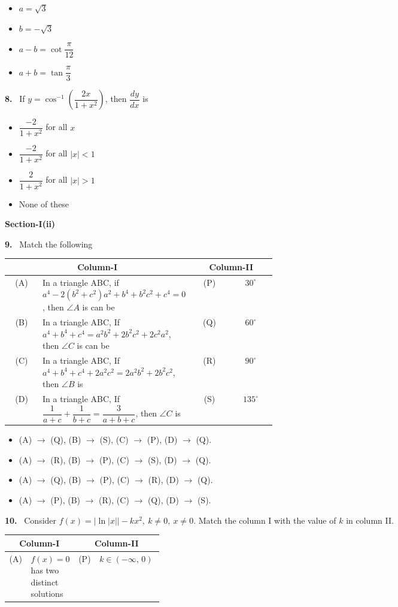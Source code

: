 \documentclass[10pt]{extarticle}
\newcommand{\sect}[1]{\par\smallskip\noindent\textbf{#1}\par}
\newcommand{\qn}[1]{\par\smallskip\noindent\textbf{#1.}~}
\newenvironment{qoptions}{\begin{itemize}[leftmargin=1.8em,itemsep=1pt,topsep=2pt,label={}]}{\end{itemize}}
\newcommand{\opt}[2]{\item[(#1)] #2}
\begin{document}
\begin{multicols}{2}
\begin{qoptions}
\opt{A}{$a=\sqrt3$}
\opt{B}{$b=-\sqrt3$}
\opt{C}{$a-b=\cot\dfrac\pi{12}$}
\opt{D}{$a+b=\tan\dfrac\pi3$}
\end{qoptions}
\qn{8} If $y=\cos^{-1}\left(\dfrac{2x}{1+x^2}\right)$, then $\dfrac{dy}{dx}$ is
\begin{qoptions}
\opt{A}{$\dfrac{-2}{1+x^2}$ for all $x$}
\opt{B}{$\dfrac{-2}{1+x^2}$ for all $|x|<1$}
\opt{C}{$\dfrac{2}{1+x^2}$ for all $|x|>1$}
\opt{D}{None of these}
\end{qoptions}
\sect{Section-I(ii)}
\qn{9} Match the following
\begin{center}\small\renewcommand{\arraystretch}{1.3}
\begin{tabular}{|c|p{0.52\linewidth}|c|c|}\hline
\multicolumn{2}{|c|}{\textbf{Column-I}} & \multicolumn{2}{c|}{\textbf{Column-II}}\\\hline
(A) & In a triangle ABC, if $a^4-2\left(b^2+c^2\right)a^2+b^4+b^2c^2+c^4=0$, then $\angle A$ is can be & (P) & $30^\circ$\\\hline
(B) & In a triangle ABC, If $a^4+b^4+c^4=a^2b^2+2b^2c^2+2c^2a^2$, then $\angle C$ is can be & (Q) & $60^\circ$\\\hline
(C) & In a triangle ABC, If $a^4+b^4+c^4+2a^2c^2=2a^2b^2+2b^2c^2$, then $\angle B$ is & (R) & $90^\circ$\\\hline
(D) & In a triangle ABC, If $\dfrac1{a+c}+\dfrac1{b+c}=\dfrac3{a+b+c}$, then $\angle C$ is & (S) & $135^\circ$\\\hline
\end{tabular}
\end{center}
\begin{qoptions}
\opt{A}{(A) $\to$ (Q), (B) $\to$ (S), (C) $\to$ (P), (D) $\to$ (Q).}
\opt{B}{(A) $\to$ (R), (B) $\to$ (P), (C) $\to$ (S), (D) $\to$ (Q).}
\opt{C}{(A) $\to$ (Q), (B) $\to$ (P), (C) $\to$ (R), (D) $\to$ (Q).}
\opt{D}{(A) $\to$ (P), (B) $\to$ (R), (C) $\to$ (Q), (D) $\to$ (S).}
\end{qoptions}
\qn{10} Consider $f(x)=\left|\ln|x|\right|-kx^2,\ k\ne0,\ x\ne0$. Match the column I with the value of $k$ in column II.
\begin{center}\small\renewcommand{\arraystretch}{1.8}
\begin{tabular}{|c|p{0.3\linewidth}||c|l|}\hline
\multicolumn{2}{|c||}{\textbf{Column-I}} & \multicolumn{2}{c|}{\textbf{Column-II}}\\\hline
(A) & $f(x)=0$ has two distinct solutions & (P) & $k\in(-\infty,\,0)$\\\hline

\end{tabular}
\end{center}
\end{multicols}
\end{document}
